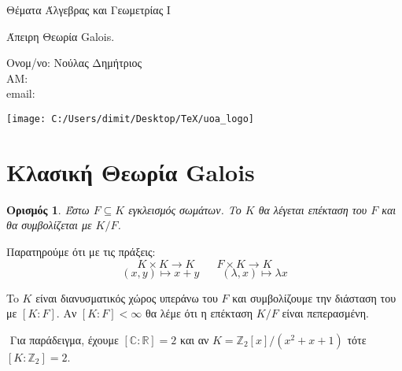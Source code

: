 \documentclass[oneside,a4paper]{article}
\newtheorem*{defn}{Ορισμός}
\newcommand {\tl}{\textlatin}
\newcommand{\Z}{\mathbb{Z}}
\begin{document}
	
	
	\begin{framed}	
		\begin{center}
			\huge Θέματα Άλγεβρας και Γεωμετρίας \tl{I}
		\end{center}
		\begin{center}
			\huge Άπειρη Θεωρία \tl{Galois}.
		\end{center}
		\vspace{0.3truecm}
		\begin{center}
			Ονομ/νο: Νούλας Δημήτριος\\
			ΑΜ: \\
			\tl{email}: \tl{}
		\end{center}
		\vspace{0.3truecm}
	\end{framed}
	\vspace*{\fill}
	\begin{center}
	\texttt{[image: C:/Users/dimit/Desktop/TeX/uoa\_logo]}
	\end{center}
\vspace{1cm}
\pagebreak
\tableofcontents
\pagebreak
\section{Κλασική Θεωρία \tl{Galois}}
\vspace{1cm}

\begin{defn}
	Έστω $F\subseteq K$ εγκλεισμός σωμάτων. Το $K$ θα λέγεται επέκταση του $F$ και θα συμβολίζεται με $K/F$.
\end{defn}

Παρατηρούμε ότι με τις πράξεις:
$$K\times K \longrightarrow K \quad\quad F \times K \longrightarrow K$$
$$(x,y) \longmapsto x+y \quad\quad (\lambda, x) \longmapsto \lambda x$$

To $K$ είναι διανυσματικός χώρος υπεράνω του $F$ και συμβολίζουμε την διάσταση του με $[K:F]$. Αν $[K:F]<\infty$ θα λέμε ότι η επέκταση $K/F$ είναι πεπερασμένη.

$ $\newline
Για παράδειγμα, έχουμε $[\mathbb C : \mathbb R] = 2$ και αν $K = \Z_2 [x]/(x^2 + x + 1)$ τότε $[K:\Z_2] = 2$.
\end{document}
